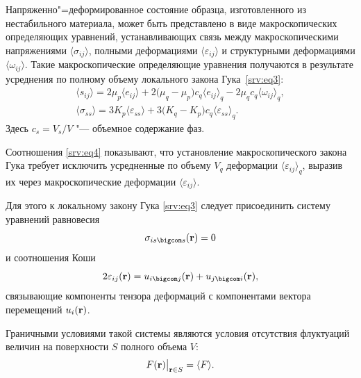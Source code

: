 Напряженно"=деформированное состояние образца, изготовленного из не\-ста\-бильного материала, может быть представлено в виде макроскопических определяющих уравнений, устанавливающих связь между макроскопическими напряжениями $ \langle  {\sigma_{ij}}  \rangle $, полными деформациями $ \langle  {\varepsilon_{ij}}  \rangle $  и структурными деформациями $ \langle  {\omega_{ij}}  \rangle $.
Такие макроскопические определяющие уравнения получаются в результате усреднения по полному объему локального закона Гука~\eqref{srv:eq3}:
\begin{equation}\label{srv:eq4}
\begin{array}{ll}
 \langle  s_{ij}  \rangle =2 \mu_{p} \big \langle e_{ij} \big \rangle+2 \big (\mu_{q}-\mu_{p} \big) c_{q}  \langle  e_{ij}  \rangle _{q}-2 \mu_{q} c_{q}  \langle  \omega_{ij}  \rangle _{q}, \\[2mm]
 \langle  \sigma_{ss}  \rangle =3 K_{p} \big \langle \varepsilon_{ss} \big \rangle+3 \big(K_{q}-K_{p} \big) c_{q}  \langle  \varepsilon_{ss}  \rangle _{q}.
\end{array}
\end{equation}
Здесь $c_{s}={V_{s}}/{V}$ "--- объемное содержание фаз.

Соотношения \eqref{srv:eq4} показывают, что установление макроскопического закона Гука требует исключить усредненные по объему $V_{q}$  деформации $ \langle  \varepsilon_{ij}  \rangle _{q}$, выразив их через макроскопические деформации $ \langle  \varepsilon_{ij}  \rangle $.

Для этого к локальному закону Гука \eqref{srv:eq3} следует присоединить систему уравнений равновесия
\begin{equation}\label{srv:eq5}
\sigma_{is\bigcom s}(\bold{r})=0
\end{equation}
и соотношения Коши
\begin{equation}\label{srv:eq6}
2 \varepsilon_{ij}(\bold{r})=u_{i\bigcom  j}(\bold{r})+u_{j\bigcom  i}(\bold{r}),
\end{equation}
связывающие компоненты тензора деформаций с компонентами вектора перемещений $u_{i}(\bold{r})$.

Граничными условиями такой системы являются условия отсутствия флуктуаций величин на поверхности $S$ полного объема $V$: 
\begin{equation}\label{srv:eq7}
F(\bold{r})\big|_{\bold{r} \in S}= \langle  F  \rangle .
\end{equation}

\smallskip

